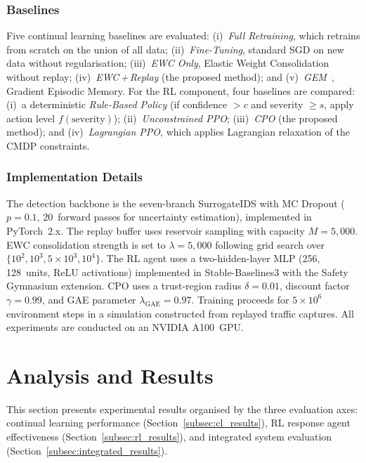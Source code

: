\documentclass[journal]{IEEEtran}
\theoremstyle{definition}
\theoremstyle{remark}
\begin{document}
\subsubsection{Baselines}
Five continual learning baselines are evaluated: (i)~\textit{Full Retraining}, which retrains from scratch on the union of all data; (ii)~\textit{Fine-Tuning}, standard SGD on new data without regularisation; (iii)~\textit{EWC Only}, Elastic Weight Consolidation without replay; (iv)~\textit{EWC\,+\,Replay} (the proposed method); and (v)~\textit{GEM}~\cite{lopezpaz2017gem}, Gradient Episodic Memory. For the RL component, four baselines are compared: (i)~a deterministic \textit{Rule-Based Policy} (if confidence $> c$ and severity $\geq s$, apply action level $f(\text{severity})$); (ii)~\textit{Unconstrained PPO}; (iii)~\textit{CPO} (the proposed method); and (iv)~\textit{Lagrangian PPO}, which applies Lagrangian relaxation of the CMDP constraints.

\subsubsection{Implementation Details}
\label{subsubsec:impl}
The detection backbone is the seven-branch SurrogateIDS with MC Dropout ($p=0.1$, 20~forward passes for uncertainty estimation), implemented in PyTorch~2.x. The replay buffer uses reservoir sampling with capacity $M = 5{,}000$. EWC consolidation strength is set to $\lambda = 5{,}000$ following grid search over $\{10^2, 10^3, 5\times10^3, 10^4\}$. The RL agent uses a two-hidden-layer MLP (256, 128~units, ReLU activations) implemented in Stable-Baselines3 with the Safety Gymnasium extension. CPO uses a trust-region radius $\delta = 0.01$, discount factor $\gamma = 0.99$, and GAE parameter $\lambda_{\mathrm{GAE}} = 0.97$. Training proceeds for $5\times10^6$ environment steps in a simulation constructed from replayed traffic captures. All experiments are conducted on an NVIDIA A100~GPU.

\section{Analysis and Results}
\label{sec:results}

This section presents experimental results organised by the three evaluation axes: continual learning performance (Section~\ref{subsec:cl_results}), RL response agent effectiveness (Section~\ref{subsec:rl_results}), and integrated system evaluation (Section~\ref{subsec:integrated_results}).
\end{document}
